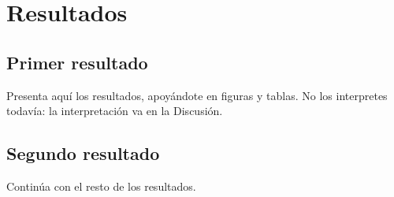 %
%

\chapter{Resultados}

\section{Primer resultado}

Presenta aquí los resultados, apoyándote en figuras y tablas. No los
interpretes todavía: la interpretación va en la Discusión.

\section{Segundo resultado}

Continúa con el resto de los resultados.
